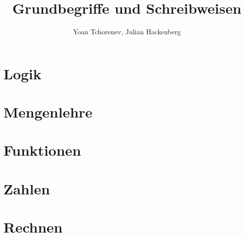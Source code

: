 \documentclass[12pt,a4paper]{article}
\title{Grundbegriffe und Schreibweisen}
\author{Yoan Tchorenev, Julian Hackenberg}
\begin{document}
    \begin{titlepage}
        \maketitle
        \thispagestyle{empty}
    \end{titlepage}

    \tableofcontents
    \newpage

    \section{Logik}\label{sec:logik}
    


    \section{Mengenlehre}\label{sec:mengenlehre}
    


    \section{Funktionen}\label{sec:funktionen}
    


    \section{Zahlen}\label{sec:zahlen}
    


    \section{Rechnen}\label{sec:rechnen}
    
\end{document}
